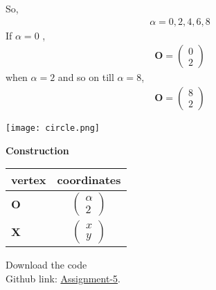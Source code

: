 \documentclass[10pt,a4paper]{report}
\newcommand{\myvec}[1]{\ensuremath{\begin{pmatrix}#1\end{pmatrix}}}
\let\vec\mathbf
\let\vec\mathbf
\begin{document}
\begin{multicols}{2}
So, \\ \vspace{1mm}
\begin{align}
    \alpha = 0,2,4,6,8
\end{align}
If $\alpha=0$ ,\\ \vspace{1mm}
\begin{align}
    \vec{O}=\myvec{
    0\\
    2
    }
\end{align}
when $\alpha=2$ and so on till $\alpha=8$,\\ \vspace{1mm}
\begin{align}
    \vec{O}=\myvec{
    8\\
    2
    } 
\end{align}


\begin{center}
 \texttt{[image: circle.png]}  
 \end{center}\vspace{1mm}
 
   

  
 \vspace{2mm} \textbf{Construction}
\begin{center}
\setlength{\arrayrulewidth}{0.5mm}
\setlength{\tabcolsep}{6pt}
\renewcommand{\arraystretch}{1.5}
    \begin{tabular}{|l|c|}
    \hline 
    \textbf{vertex} & \textbf{coordinates} \\ \hline
   $\vec{O}$ & $\myvec{
   \alpha\\
   2
   } $ \\\hline
   $\vec{X}$ & $\myvec{
   x\\
   y
   } $ \\\hline
      \end{tabular}
  \end{center}
  
\raggedright  Download the code \\
Github link: \href{https://github.com/chiragshah1244/FWC/blob/main/assignments/assignment_5/code/circle.py}{Assignment-5}.
  \end{multicols}
\end{document}
